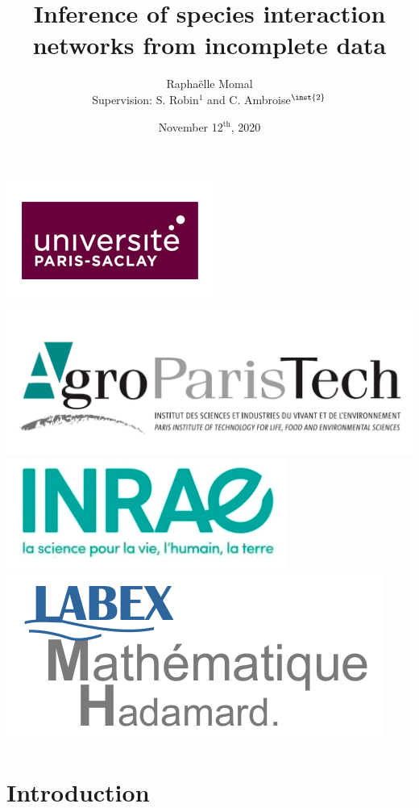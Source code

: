 \documentclass[11pt]{beamer}
\title{Inference of species interaction networks from incomplete data}
\author{Raphaëlle Momal\\
\tiny{Supervision:  S. Robin$^{{1}}$ and C. Ambroise$^{\inst{2}}$  }}
\institute[]
{
  \inst{1}%
  UMR AgroParisTech / INRA MIA-Paris \\
  \inst{2}%
  LaMME, Evry
  }
\date{November 12$^{\text{th}}$, 2020}
\begin{document}
\begin{frame}
    \titlepage
    \begin{center}
    \includegraphics[width=0.15\linewidth]{images/UPsaclay.png}
    \includegraphics[width=0.2\linewidth]{images/agro.PNG}\hspace{0.1cm}
	\includegraphics[width=0.15\linewidth]{images/inrae.png}\hspace{0.15cm}
	\includegraphics[width=0.17\linewidth]{images/lmh.png}\hspace{0.15cm}
\end{center}
\end{frame}



\section{Introduction}
\end{document}
